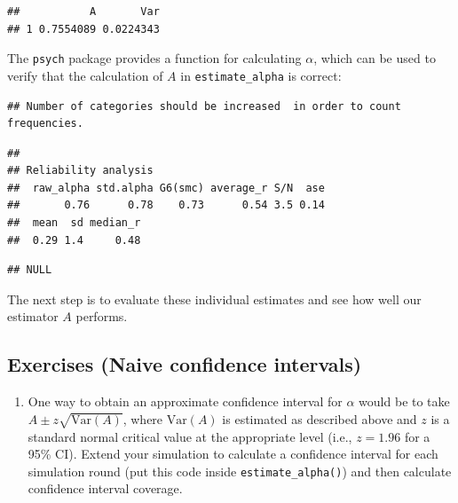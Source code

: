 \documentclass[
]{book}
\newenvironment{Shaded}{\begin{snugshade}}{\end{snugshade}}
\newcommand{\AttributeTok}[1]{\textcolor[rgb]{0.13,0.29,0.53}{#1}}
\newcommand{\FunctionTok}[1]{\textcolor[rgb]{0.13,0.29,0.53}{\textbf{#1}}}
\newcommand{\NormalTok}[1]{#1}
\newcommand{\SpecialCharTok}[1]{\textcolor[rgb]{0.81,0.36,0.00}{\textbf{#1}}}
\providecommand{\tightlist}{%
  \setlength{\itemsep}{0pt}\setlength{\parskip}{0pt}}
\begin{document}
\begin{verbatim}
##           A       Var
## 1 0.7554089 0.0224343
\end{verbatim}

The \texttt{psych} package provides a function for calculating \(\alpha\), which can be used to verify that the calculation of \(A\) in \texttt{estimate\_alpha} is correct:

\begin{Shaded}
\end{Shaded}

\begin{verbatim}
## Number of categories should be increased  in order to count frequencies.
\end{verbatim}

\begin{verbatim}
## 
## Reliability analysis   
##  raw_alpha std.alpha G6(smc) average_r S/N  ase
##       0.76      0.78    0.73      0.54 3.5 0.14
##  mean  sd median_r
##  0.29 1.4     0.48
\end{verbatim}

\begin{verbatim}
## NULL
\end{verbatim}

The next step is to evaluate these individual estimates and see how well our estimator \(A\) performs.

\subsection{Exercises (Naive confidence intervals)}\label{exercises-naive-confidence-intervals}

\begin{enumerate}
\def\labelenumi{\arabic{enumi}.}
\tightlist
\item
  One way to obtain an approximate confidence interval for \(\alpha\) would be to take \(A \pm z \sqrt{\text{Var}(A)}\), where \(\text{Var}(A)\) is estimated as described above and \(z\) is a standard normal critical value at the appropriate level (i.e., \(z = 1.96\) for a 95\% CI).
  Extend your simulation to calculate a confidence interval for each simulation round (put this code inside \texttt{estimate\_alpha()}) and then calculate confidence interval coverage.
\end{enumerate}
\end{document}
